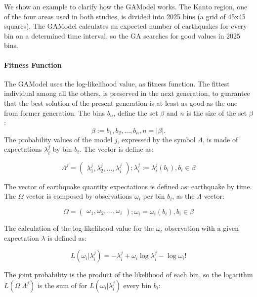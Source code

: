 We show an example to clarify how the GAModel works. The Kanto region, one of the four areas used in both studies, is divided into 2025 bins (a grid of 45x45 squares). The GAModel calculates an expected number of earthquakes for every bin on a determined time interval, so the GA searches for good values in 2025 bins.
\paragraph{Fitness Function}\label{fitGA}

The GAModel uses the log-likelihood value, as fitness
function. The fittest individual among all the others, is preserved in the next generation, to guarantee that the best solution of the present generation is at least as good as the one from former generation.  The bins $b_n$, define the set $\beta$ and $n$ is the size of the set $\beta$:
\begin{equation} 
\beta := {b_1,b_2,...,b_n},n = |\beta|.
\end{equation}
The probability values of the model $j$, expressed by the symbol
$\Lambda$, is made of expectations $\lambda_i^j$ by bin $b_i$. The
vector is define as:

\begin{equation}
\Lambda^j = 
\begin{pmatrix}
\lambda_1^j, 
\lambda_2^j, 
\hdots,
\lambda_i^j
\end{pmatrix}
;\lambda_i^j := \lambda_i^j(b_i),b_i \in \beta
\end{equation}

The vector of earthquake quantity expectations is defined as:
earthquake by time. The $\Omega$ vector is composed by observations
$\omega_i$ per bin $b_i$, as the $\Lambda$ vector:

\begin{equation}
\Omega = 
\begin{pmatrix}
\omega_1,
\omega_2,
\hdots,
\omega_i
\end{pmatrix}
;\omega_i =\omega_i(b_i),b_i \in \beta
\end{equation}

The calculation of the log-likelihood value for the $\omega_i$
observation with a given expectation $\lambda$ is defined as:


\begin{equation}
L(\omega_i|\lambda_i^j) = -\lambda_i^j + \omega_i\log\lambda_i^j - \log\omega_i!
\end{equation}

The joint probability is the product of the likelihood of each bin, so the logarithm $L(\Omega|\Lambda^j)$ is the sum of for
$L(\omega_i|\lambda_i^j)$ every bin $b_i$:

